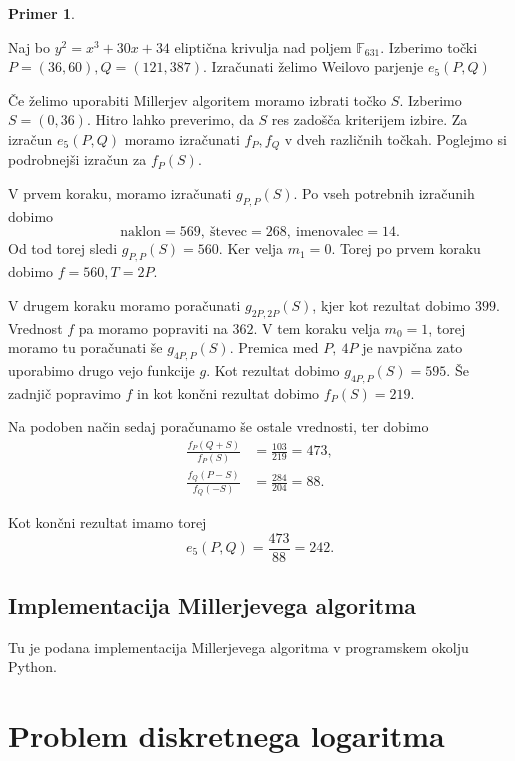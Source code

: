 \documentclass[12pt,a4paper,twoside]{article}
\theoremstyle{definition} %
\newtheorem{primer}[definicija]{Primer}
\theoremstyle{plain} %
\numberwithin{equation}{section}  %
\newcommand{\F}{\mathbb F}
\begin{document}
\begin{primer}~

Naj bo $y^2 = x^3+30x+34$ eliptična krivulja nad poljem $\F_{631}$. Izberimo točki $P = (36,60),Q = (121,387)$. Izračunati želimo Weilovo parjenje $e_5(P,Q)$

Če želimo uporabiti Millerjev algoritem moramo izbrati točko $S$. Izberimo $S=(0,36)$. Hitro lahko preverimo, da $S$ res zadošča kriterijem izbire.
Za izračun $e_5(P,Q)$ moramo izračunati $f_P,f_Q$ v dveh različnih točkah. Poglejmo si podrobnejši izračun za $f_P(S)$.

V prvem koraku, moramo izračunati $g_{P,P}(S)$. Po vseh potrebnih izračunih dobimo $$\text{naklon} = 569,\ \text{števec} = 268,\ \text{imenovalec} = 14.$$ Od tod torej sledi $g_{P,P}(S) = 560$. Ker velja $m_1 = 0$. Torej po prvem koraku dobimo $f = 560, T = 2P$.

V drugem koraku moramo poračunati $g_{2P,2P}(S)$, kjer kot rezultat dobimo $399$. Vrednost $f$ pa moramo popraviti na $362$. V tem koraku velja $m_0 = 1$, torej moramo tu poračunati še
$g_{4P,P}(S)$. Premica med $P,\ 4P$ je navpična zato uporabimo drugo vejo funkcije $g$. Kot rezultat dobimo $g_{4P,P}(S) = 595$. Še zadnjič popravimo $f$ in kot končni rezultat dobimo
$f_P(S) = 219$.

Na podoben način sedaj poračunamo še ostale vrednosti, ter dobimo
\begin{align}
\frac{f_P(Q+S)}{f_P(S)} &{}= \frac{103}{219} = 473, \nonumber \\
\frac{f_Q(P-S)}{f_Q(-S)} &{}= \frac{284}{204} = 88. \nonumber
\end{align}

Kot končni rezultat imamo torej
$$e_5(P,Q) =\frac{473}{88} = 242.$$

\end{primer}

\subsection{Implementacija Millerjevega algoritma}
Tu je podana implementacija Millerjevega algoritma v programskem okolju Python.



\newpage

\section{Problem diskretnega logaritma}
\end{document}
